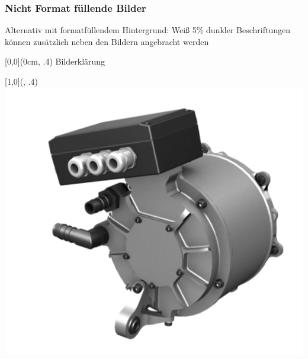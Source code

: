 \begin{frame}
    \frametitle{Nicht Format füllende Bilder}
    
Alternativ mit formatfüllendem Hintergrund: Weiß 5\% dunkler\newline
Beschriftungen können zusätzlich neben den Bildern angebracht werden

\begin{textblock*}{\paperwidth}[0,0](0cm, .4\textheight)%
Bilderklärung
\end{textblock*}

\begin{textblock*}{\paperwidth}[1,0](\textwidth, .4\textheight)%
\raggedleft%
\includegraphics[height=0.5\textheight]{./Ressourcen/Praesentation/Bilder/Motor.png}
\end{textblock*}

\end{frame}
\clearpage


